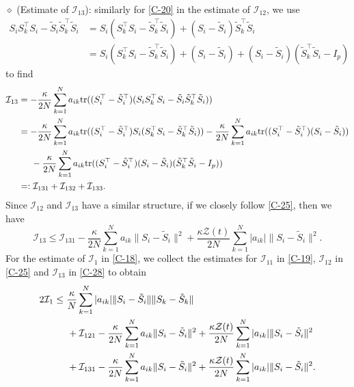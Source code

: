 \documentclass[11pt,reqno]{amsart}
\numberwithin{figure}{section}
\newcommand{\kp}{\kappa}
\newcommand{\tr}{{\textup{tr}}}
\begin{document}
$\diamond$ (Estimate of $\mathcal I_{13}$): similarly for \eqref{C-20} in the estimate of $\mathcal I_{12}$, we use 
\begin{align*}
S_iS_k^\top S_i - \tilde S_i \tilde S_k^\top \tilde S_i & = S_i ( S_k^\top S_i - \tilde S_k^\top \tilde S_i) + (S_i  - \tilde S_i) \tilde S_k^\top \tilde S_i  \\
 & = S_i ( S_k^\top S_i - \tilde S_k^\top \tilde S_i) + (S_i  - \tilde S_i) + (S_i - \tilde S_i) (\tilde S_k^\top \tilde S_i - I_p)
\end{align*}
to find 
\begin{align*}
\mathcal I_{13} &  =  -\frac{\kp}{2N} \sum_{k=1}^N a_{ik} \tr( ( S_i^\top - \tilde S_i^\top) (S_iS_k^\top S_i - \tilde S_i \tilde S_k^\top \tilde S_i)) \\
& = -\frac{\kp}{2N} \sum_{k=1}^N a_{ik} \tr(( S_i^\top - \tilde S_i^\top)S_i(S_k^\top S_i - \tilde S_k^\top \tilde S_i)) -\frac{\kp}{2N} \sum_{k=1}^N a_{ik} \tr(( S_i^\top -\tilde S_i^\top)(S_i- \tilde S_i)) \\
& \hspace{0.5cm}- \frac{\kp}{2N} \sum_{k=1}^N a_{ik} \tr(( S_i^\top - \tilde S_i^\top)(S_i-\tilde S_i) ( \tilde S_k^\top \tilde S_i - I_p)) \\
& =: \mathcal I_{131} + \mathcal I_{132} + \mathcal I_{133} .
\end{align*}
Since $\mathcal I_{12}$ and $\mathcal I_{13}$ have a similar structure, if we closely follow \eqref{C-25}, then we have 
\begin{equation} \label{C-28}
\mathcal I_{13} \leq \mathcal I_{131} - \frac{\kp}{2N} \sum_{k=1}^N a_{ik} \|S_i - \tilde S_i\|^2 + \frac{\kp \mathcal Z(t) }{2N} \sum_{k=1}^N |a_{ik} |\|S_i - \tilde S_i\|^2.
\end{equation} 
For the estimate of $\mathcal I_1$ in \eqref{C-18}, we collect the estimates for $\mathcal I_{11}$ in \eqref{C-19}, $\mathcal I_{12}$ in \eqref{C-25} and $\mathcal I_{13}$ in \eqref{C-28} to obtain 
\begin{align} \label{C-30}
\begin{aligned}
 2\mathcal I_1 & \leq \frac\kp N \sum_{k=1}^N |a_{ik}| \|S_i - \tilde S_i\| \|S_k - \tilde S_k \| \\
& \hspace{0.5cm}+  \mathcal I_{121} -\frac{\kp}{2N} \sum_{k=1}^N a_{ik} \|S_i - \tilde S_i\|^2  + \frac{\kp \mathcal Z(t) }{2N}\sum_{k=1}^N |a_{ik}|  \|S_i - \tilde S_i\|^2\\
& \hspace{0.5cm}+ \mathcal I_{131} - \frac{\kp}{2N} \sum_{k=1}^N a_{ik} \|S_i - \tilde S_i\|^2 + \frac{\kp \mathcal Z(t) }{2N} \sum_{k=1}^N |a_{ik} |\|S_i - \tilde S_i\|^2. 
\end{aligned}
\end{align}
\end{document}
